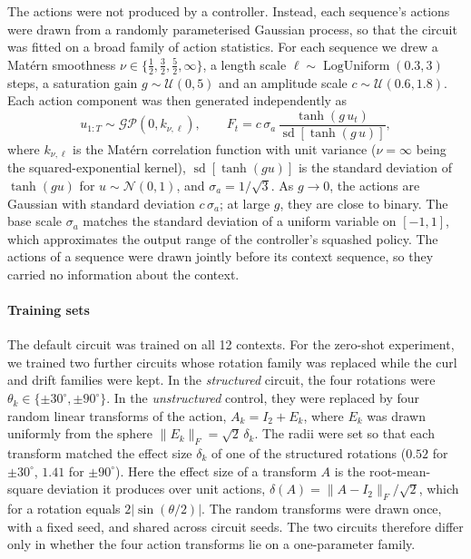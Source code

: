 The actions were not produced by a controller. Instead, each sequence's actions were drawn from a randomly parameterised Gaussian process, so that the circuit was fitted on a broad family of action statistics. For each sequence we drew a Mat\'ern smoothness $\nu \in \{\tfrac{1}{2}, \tfrac{3}{2}, \tfrac{5}{2}, \infty\}$, a length scale $\ell \sim \operatorname{LogUniform}(0.3, 3)$ steps, a saturation gain $g \sim \mathcal{U}(0, 5)$ and an amplitude scale $c \sim \mathcal{U}(0.6, 1.8)$. Each action component was then generated independently as
\begin{equation}
    u_{1:T} \sim \mathcal{GP}\!\left(0, k_{\nu, \ell}\right), \qquad
    F_t = c \, \sigma_a \, \frac{\tanh(g \, u_t)}{\operatorname{sd}\!\left[\tanh(g \, u)\right]},
\end{equation}
where $k_{\nu,\ell}$ is the Mat\'ern correlation function with unit variance ($\nu = \infty$ being the squared-exponential kernel), $\operatorname{sd}[\tanh(g u)]$ is the standard deviation of $\tanh(g u)$ for $u \sim \mathcal{N}(0, 1)$, and $\sigma_a = 1/\sqrt{3}$. As $g \to 0$, the actions are Gaussian with standard deviation $c \, \sigma_a$; at large $g$, they are close to binary. The base scale $\sigma_a$ matches the standard deviation of a uniform variable on $[-1, 1]$, which approximates the output range of the controller's squashed policy. The actions of a sequence were drawn jointly before its context sequence, so they carried no information about the context.

\paragraph{Training sets}
The default circuit was trained on all 12 contexts. For the zero-shot experiment, we trained two further circuits whose rotation family was replaced while the curl and drift families were kept. In the \textit{structured} circuit, the four rotations were $\theta_k \in \{\pm 30^\circ, \pm 90^\circ\}$. In the \textit{unstructured} control, they were replaced by four random linear transforms of the action, $A_k = I_2 + E_k$, where $E_k$ was drawn uniformly from the sphere $\lVert E_k \rVert_F = \sqrt{2}\, \delta_k$. The radii were set so that each transform matched the effect size $\delta_k$ of one of the structured rotations ($0.52$ for $\pm 30^\circ$, $1.41$ for $\pm 90^\circ$). Here the effect size of a transform $A$ is the root-mean-square deviation it produces over unit actions, $\delta(A) = \lVert A - I_2 \rVert_F / \sqrt{2}$, which for a rotation equals $2\lvert\sin(\theta/2)\rvert$. The random transforms were drawn once, with a fixed seed, and shared across circuit seeds. The two circuits therefore differ only in whether the four action transforms lie on a one-parameter family.

